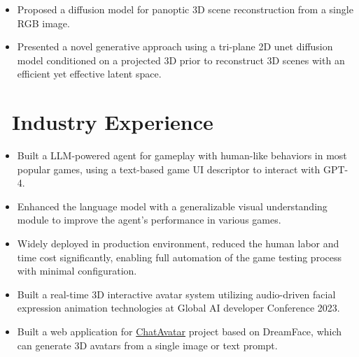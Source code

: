\documentclass{resume}
\begin{document}

\begin{itemize}
  \item Proposed a diffusion model for panoptic 3D scene reconstruction from a single RGB image.
  \item Presented a novel generative approach using a tri-plane 2D unet diffusion model conditioned on a projected 3D prior to reconstruct 3D scenes with an efficient yet effective latent space.
\end{itemize}

\section{\faUsers\ Industry Experience}


\begin{itemize}
  \item Built a LLM-powered agent for gameplay with human-like behaviors in most popular games, using a text-based game UI descriptor to interact with GPT-4.
  \item Enhanced the language model with a generalizable visual understanding module to improve the agent's performance in various games.
  \item Widely deployed in production environment, reduced the human labor and time cost significantly, enabling full automation of the game testing process with minimal configuration.
\end{itemize}


\begin{itemize}
  \item Built a real-time 3D interactive avatar system utilizing audio-driven facial expression animation technologies at Global AI developer Conference 2023.
  \item Built a web application for \href{https://hyperhuman.deemos.com/}{ChatAvatar} project based on DreamFace\cite{zhang2023dreamface}, which can generate 3D avatars from a single image or text prompt.
\end{itemize}
\end{document}
